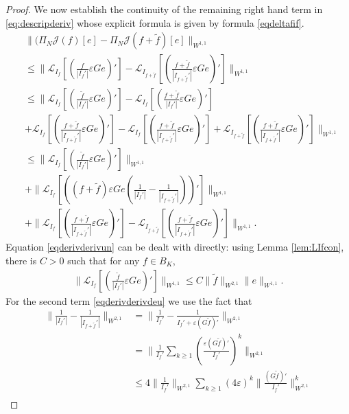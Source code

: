 \documentclass[12pt]{article}
\def\L{\mathcal{L}}
\newcommand{\eps}{\varepsilon}
\theoremstyle{plain}
\begin{document}
{\begin{proof}
We now establish the continuity of the remaining right hand term in \eqref{eq:descripderiv} whose explicit formula is given by formula \eqref{eqdeltafif}.
\begin{align}
  &\|  (\Pi_N\mathcal J(f)[e]-\Pi_N\mathcal J(f+\tilde f)[e] \|_{W^{1,1}}\nonumber\\
  &\leq \|\L_{I_f}\left[\left(\frac{f}{|I_{f}'|} \eps G e\right)'\right]-\L_{I_{f+\tilde f}}\left[\left(\frac{f+\tilde f}{|I_{f+\tilde f}'|} \eps G e\right)'\right]\|_{W^{1,1}}\nonumber\\
  &\leq \|\L_{I_f}\left[\left(\frac{\tilde f}{|I_{f}'|} \eps G e\right)'\right]-\L_{I_{f}}\left[\left(\frac{f+\tilde f}{|I_{f}'|} \eps G e\right)'\right]\nonumber\\
  &+\L_{I_{f}}\left[\left(\frac{f+\tilde f}{|I_{f+\tilde f}'|} \eps G e\right)'\right]-\L_{I_{f}}\left[\left(\frac{f+\tilde f}{|I_{f+\tilde f}'|} \eps G e\right)'\right]+\L_{I_{f+\tilde f}}\left[\left(\frac{f+\tilde f}{|I_{f+\tilde f}'|} \eps G e\right)'\right]\|_{W^{1,1}}\nonumber\\
   &\leq\|\L_{I_f}\left[\left(\frac{\tilde f}{|I_{f}'|} \eps G e\right)'\right]\|_{W^{1,1}}\label{eqderivderivun}\\
   &+\|\L_{I_{f}}\left[\left((f+\tilde f) \eps G e (\frac{1}{|I_{f}'|}-\frac{1}{|I_{f+\tilde f}'|} )\right)'\right]\|_{W^{1,1}}\label{eqderivderivdeu}\\
   &+\|\L_{I_{f}}\left[\left(\frac{f+\tilde f}{|I_{f+\tilde f}'|} \eps G e\right)'\right]-\L_{I_{f+\tilde f}}\left[\left(\frac{f+\tilde f}{|I_{f+\tilde f}'|} \eps G e\right)'\right]\|_{W^{1,1}}\label{eqderivderivtroi}.
\end{align}
Equation \eqref{eqderivderivun} can be dealt with directly:  using Lemma \ref{lem:LIfcon}, there is $C>0$ such that for any $f\in B_K$, 
\begin{align}\label{eq:boundLIf}
    \|\L_{I_f}\left[\left(\frac{\tilde f}{|I_{f}'|} \eps G e\right)'\right]\|_{W^{1,1}}\leq C\|\tilde f\|_{W^{2,1}}\|e\|_{W^{1,1}}.
\end{align}
For the second term \eqref{eqderivderivdeu} we use the fact that 
\begin{align*}
    \|\frac{1}{|I_{f}'|}-\frac{1}{|I_{f+\tilde f}'|}\|_{W^{2,1}}&=\|\frac{1}{I_{f}'}-\frac{1}{I_{f}'+\eps(G\tilde f)'}\|_{W^{2,1}}\\
    &=\|\frac{1}{I_{f}'}\sum_{k\geq 1}\left(\frac{\eps(G\tilde f)'}{I_f'}\right)^k\|_{W^{2,1}}\\
     &\leq 4\|\frac{1}{I_{f}'}\|_{W^{2,1}}\sum_{k\geq 1}(4\eps)^k\|\frac{(G\tilde f)'}{I_f'}\|_{W^{2,1}}^k\\

\end{align*}
\end{proof}}
\end{document}
